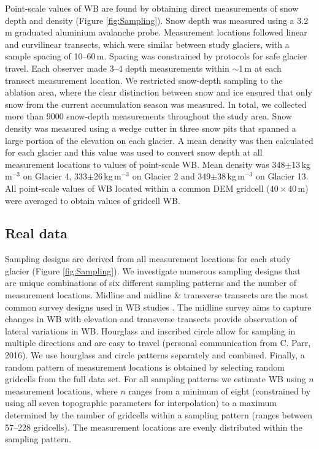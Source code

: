 \documentclass[twocolumn,letterpaper]{igs}
\begin{document}
Point-scale values of WB are found by obtaining direct measurements of snow depth and density (Figure \ref{fig:Sampling}). Snow depth was measured using a 3.2\,m graduated aluminium avalanche probe. Measurement locations followed linear and curvilinear transects, which were similar between study glaciers, with a sample spacing of 10--60\,m.  Spacing was constrained by protocols for safe glacier travel. Each observer made 3--4 depth measurements within $\sim$1\,m at each transect measurement location. We restricted snow-depth sampling to the ablation area, where the clear distinction between snow and ice ensured that only snow from the current accumulation season was measured. In total, we collected more than 9000 snow-depth measurements throughout the study area. Snow density was measured using a wedge cutter in three snow pits that spanned a large portion of the elevation on each glacier. A mean density was then calculated for each glacier and this value was used to convert snow depth at all measurement locations to values of point-scale WB. Mean density was 348$\pm$13\,kg\,m$^{-3}$ on Glacier 4, 333$\pm$26\,kg\,m$^{-3}$ on Glacier 2 and 349$\pm$38\,kg\,m$^{-3}$ on Glacier 13. All point-scale values of WB located within a common DEM gridcell ($40\times40$\,m) were averaged to obtain values of gridcell WB. 

\subsection{Real data}

Sampling designs are derived from all measurement locations for each study glacier (Figure \ref{fig:Sampling}). We investigate numerous sampling designs that are unique combinations of six different sampling patterns and the number of measurement locations. Midline and midline \& transverse transects are the most common survey designs used in WB studies \citep[e.g.][]{Kaser2002, Machguth2006}. The midline survey aims to capture changes in WB with elevation and transverse transects provide observation of lateral variations in WB. Hourglass and inscribed circle allow for sampling in multiple directions and are easy to travel (personal communication from C. Parr, 2016). We use hourglass and circle patterns separately and combined. Finally, a random pattern of measurement locations is obtained by selecting random gridcells from the full data set. For all sampling patterns we estimate WB using $n$ measurement locations, where $n$ ranges from a minimum of eight (constrained by using all seven topographic parameters for interpolation) to a maximum determined by the number of gridcells within a sampling pattern (ranges between 57--228 gridcells). The measurement locations are evenly distributed within the sampling pattern. 
\end{document}
